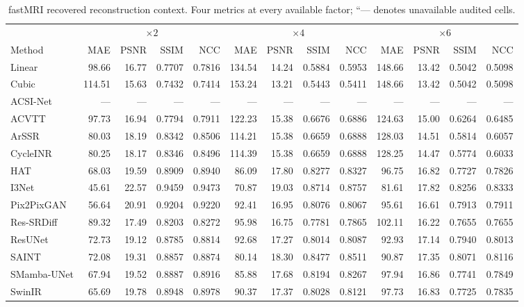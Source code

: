 \begin{table}[t]
\caption{fastMRI recovered reconstruction context. Four metrics at every available factor; ``--- denotes unavailable audited cells.}
\label{tab:arch-benchmark}\centering\scriptsize
\setlength{\tabcolsep}{3pt}
\begin{tabular}{lrrrrrrrrrrrr}
\toprule
&\multicolumn{4}{c}{$\times2$}&\multicolumn{4}{c}{$\times4$}&\multicolumn{4}{c}{$\times6$}\\
Method&MAE&PSNR&SSIM&NCC&MAE&PSNR&SSIM&NCC&MAE&PSNR&SSIM&NCC\\
\midrule
Linear & 98.66 & 16.77 & 0.7707 & 0.7816 & 134.54 & 14.24 & 0.5884 & 0.5953 & 148.66 & 13.42 & 0.5042 & 0.5098 \\
Cubic & 114.51 & 15.63 & 0.7432 & 0.7414 & 153.24 & 13.21 & 0.5443 & 0.5411 & 148.66 & 13.42 & 0.5042 & 0.5098 \\
ACSI-Net & --- & --- & --- & --- & --- & --- & --- & --- & --- & --- & --- & --- \\
ACVTT & 97.73 & 16.94 & 0.7794 & 0.7911 & 122.23 & 15.38 & 0.6676 & 0.6886 & 124.63 & 15.00 & 0.6264 & 0.6485 \\
ArSSR & 80.03 & 18.19 & 0.8342 & 0.8506 & 114.21 & 15.38 & 0.6659 & 0.6888 & 128.03 & 14.51 & 0.5814 & 0.6057 \\
CycleINR & 80.25 & 18.17 & 0.8346 & 0.8496 & 114.39 & 15.38 & 0.6659 & 0.6888 & 128.25 & 14.47 & 0.5774 & 0.6033 \\
HAT & 68.03 & 19.59 & 0.8909 & 0.8940 & 86.09 & 17.80 & 0.8277 & 0.8327 & 96.75 & 16.82 & 0.7727 & 0.7826 \\
I3Net & 45.61 & 22.57 & 0.9459 & 0.9473 & 70.87 & 19.03 & 0.8714 & 0.8757 & 81.61 & 17.82 & 0.8256 & 0.8333 \\
Pix2PixGAN & 56.64 & 20.91 & 0.9204 & 0.9220 & 92.41 & 16.95 & 0.8076 & 0.8067 & 95.61 & 16.61 & 0.7913 & 0.7911 \\
Res-SRDiff & 89.32 & 17.49 & 0.8203 & 0.8272 & 95.98 & 16.75 & 0.7781 & 0.7865 & 102.11 & 16.22 & 0.7655 & 0.7655 \\
ResUNet & 72.73 & 19.12 & 0.8785 & 0.8814 & 92.68 & 17.27 & 0.8014 & 0.8087 & 92.93 & 17.14 & 0.7940 & 0.8013 \\
SAINT & 72.08 & 19.31 & 0.8857 & 0.8874 & 80.14 & 18.30 & 0.8477 & 0.8511 & 90.87 & 17.35 & 0.8071 & 0.8116 \\
SMamba-UNet & 67.94 & 19.52 & 0.8887 & 0.8916 & 85.88 & 17.68 & 0.8194 & 0.8267 & 97.94 & 16.86 & 0.7741 & 0.7849 \\
SwinIR & 65.69 & 19.78 & 0.8948 & 0.8978 & 90.37 & 17.37 & 0.8028 & 0.8121 & 97.73 & 16.83 & 0.7725 & 0.7835 \\
\bottomrule
\end{tabular}
\end{table}
